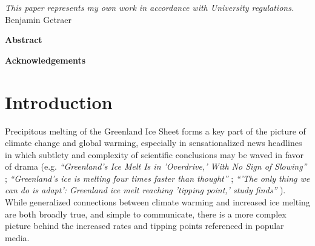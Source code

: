 \documentclass[11pt]{report}
\begin{document}



\thispagestyle{empty}
\vspace*{3in}
\begin{center}
\emph{This paper represents my own work in accordance with University regulations.} \\
Benjamin Getraer %
\end{center}
\clearpage

\begin{center}
\Large \textbf{Abstract}
\end{center}
 
 \clearpage

\begin{center}
\Large \textbf{Acknowledgements}
\end{center}

\clearpage

\thispagestyle{empty}
\tableofcontents
\clearpage

\listoffigures
\listoftables
\clearpage

\fancyhead{}
\fancyfoot{}
\pagestyle{fancyplain}

{\newpage\renewcommand{\thepage}{\arabic{page}}\setcounter{page}{1}}


\section{Introduction \label{sec:introduction}}

Precipitous melting of the Greenland Ice Sheet forms a key part of the picture of climate change and global warming, especially in sensationalized news headlines in which subtlety and complexity of scientific conclusions may be waved in favor of drama (e.g. \textit{``Greenland's Ice Melt Is in 'Overdrive,' With No Sign of Slowing''} \cite[][]{climatenews}; \textit{``Greenland's ice is melting four times faster than thought''} \cite[][]{natgeo}; \textit{``'The only thing we can do is adapt': Greenland ice melt reaching 'tipping point,' study finds''} \cite[][]{cnn}). While generalized connections between climate warming and increased ice melting are both broadly true, and simple to communicate, there is a more complex picture behind the increased rates and tipping points referenced in popular media. 
\end{document}
